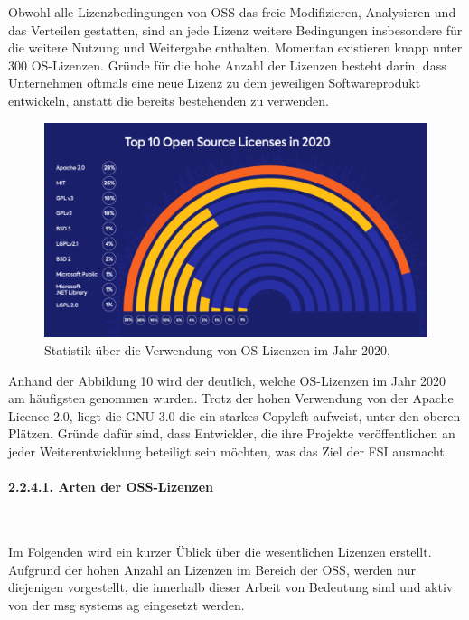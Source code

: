 Obwohl alle Lizenzbedingungen von OSS das freie Modifizieren, Analysieren und das Verteilen gestatten, sind an jede Lizenz weitere Bedingungen insbesondere für die weitere Nutzung und Weitergabe enthalten. Momentan existieren knapp unter 300 OS-Lizenzen. \cite{linux_fondation_spdx_2018} Gründe für die hohe Anzahl der Lizenzen besteht darin, dass Unternehmen oftmals eine neue Lizenz zu dem jeweiligen Softwareprodukt entwickeln, anstatt die bereits bestehenden zu verwenden. \cite[S. 33]{schaaf_open-source-lizenzen_2013} 

\begin{figure}[h]
    \centering
    \includegraphics[scale=0.35]{Bilder/Statistik Verwendung OSS.png}
    \caption{Statistik über die Verwendung von OS-Lizenzen im Jahr 2020, \cite{whitesource_software_open_2021}}
\end{figure}

Anhand der Abbildung 10 wird der deutlich, welche OS-Lizenzen im Jahr 2020 am häufigsten genommen wurden. Trotz der hohen Verwendung von der Apache Licence 2.0, liegt die GNU 3.0 die ein starkes Copyleft aufweist, unter den oberen Plätzen. Gründe dafür sind, dass Entwickler, die ihre Projekte veröffentlichen an jeder Weiterentwicklung beteiligt sein möchten, was das Ziel der FSI ausmacht. 

\paragraph{2.2.4.1. Arten der OSS-Lizenzen} $~$

Im Folgenden wird ein kurzer Üblick über die wesentlichen Lizenzen erstellt. Aufgrund der hohen Anzahl an Lizenzen im Bereich der OSS, werden nur diejenigen vorgestellt, die innerhalb dieser Arbeit von Bedeutung sind und aktiv von der msg systems ag eingesetzt werden. 

